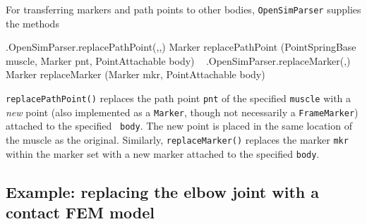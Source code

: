 For transferring markers and path points to other bodies, {\tt OpenSimParser}
supplies the methods
%
\begin{methodtable}{0.9}{0.1}
\midline
%
\methodentry
{\osim.OpenSimParser.replacePathPoint(,,)}%
{Marker replacePathPoint (PointSpringBase muscle, Marker pnt,
PointAttachable body)}%
{\ }%
%
\methodspace{0.5em}
\methodentry
{\osim.OpenSimParser.replaceMarker(,)}%
{Marker replaceMarker (Marker mkr, PointAttachable body)}%
{\ }%
%
\midline
\end{methodtable}
%
{\tt replacePathPoint()} replaces the path point {\tt pnt} of the specified
{\tt muscle} with a {\it new} point (also implemented as a {\tt Marker},
though not necessarily a {\tt FrameMarker}) attached to the specified {\tt
body}. The new point is placed in the same location of the muscle as the
original. Similarly, {\tt replaceMarker()} replaces the marker {\tt mkr} within
the marker set with a new marker attached to the specified {\tt body}.

\subsection{Example: replacing the elbow joint with a contact FEM model}
\label{Arm26FemElbow:sec}

